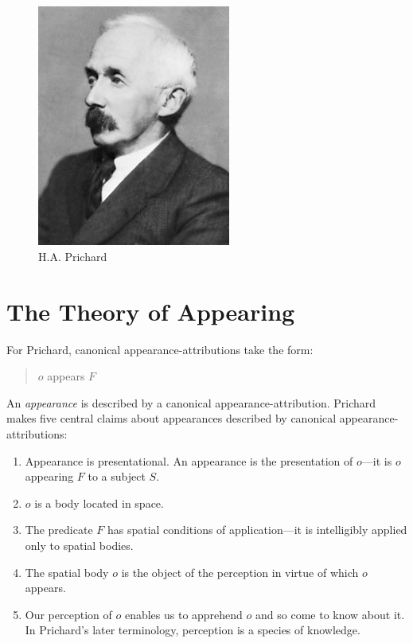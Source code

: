 \documentclass[11pt]{article}
\title{\mytitle\\
\mysubtitle}
\author{\myauthor}
\date{} %
\begin{document}
\maketitle

\setlength{\parindent}{1em}


\begin{figure}[htbp]
    \centering
        \includegraphics[scale=.5]{../../graphics/prichard.jpg}
    \caption{H.A. Prichard}
    \label{fig:prichard}
\end{figure}

\section{The Theory of Appearing} %
\label{sec:the_theory_of_appearing}
For Prichard, canonical appearance-attributions take the form:
    \begin{quote}
        \( o \) appears \( F \)
    \end{quote}
An \emph{appearance} is described by a canonical appearance-attribution. Prichard makes five central claims about appearances described by canonical appearance-attributions:
    \begin{enumerate}
        \item Appearance is presentational. An appearance is the presentation of \( o \)---it is \( o \) appearing \( F \) to a subject \( S \).
        \item \( o \) is a body located in space.
        \item The predicate \( F \) has spatial conditions of application---it is intelligibly applied only to spatial bodies.
        \item The spatial body \( o \) is the object of the perception in virtue of which \( o \) appears.
        \item Our perception of \( o \) enables us to apprehend \( o \) and so come to know about it. In Prichard's later terminology, perception is a species of knowledge.
    \end{enumerate}
\end{document}
